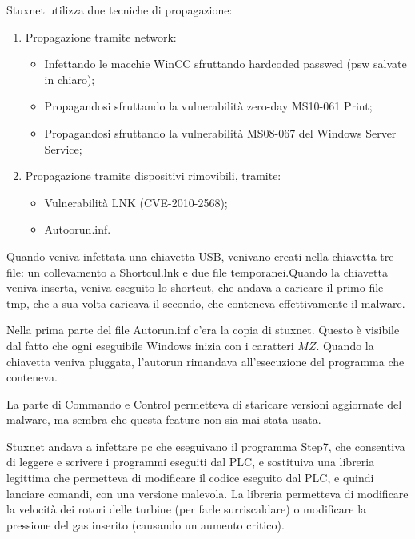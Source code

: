 \noindent Stuxnet utilizza due tecniche di propagazione:
\begin{enumerate}
    \item Propagazione tramite network:
	\begin{itemize}
	    \item Infettando le macchie WinCC sfruttando hardcoded passwed (psw salvate in chiaro);
    	\item Propagandosi sfruttando la vulnerabilità zero-day MS10-061 Print;
    	\item Propagandosi sfruttando la vulnerabilità  MS08-067 del Windows Server Service;
	\end{itemize}
    \item Propagazione tramite dispositivi rimovibili, tramite:
    \begin{itemize}
        \item Vulnerabilità LNK (CVE-2010-2568);
    	\item Autoorun.inf.
    \end{itemize}
\end{enumerate}

\noindent Quando veniva infettata una chiavetta USB, venivano creati nella chiavetta tre file: un collevamento a Shortcul.lnk e due file temporanei.Quando la chiavetta veniva inserta, veniva eseguito lo shortcut, che andava a caricare il primo file tmp, che a sua volta caricava il secondo, che conteneva effettivamente il malware. 
	
Nella prima parte del file Autorun.inf c'era la copia di stuxnet. Questo è visibile dal fatto che ogni eseguibile Windows inizia con i caratteri $MZ$. 
Quando la chiavetta veniva pluggata, l'autorun rimandava all'esecuzione del programma che conteneva.
	
La parte di Commando e Control permetteva di staricare versioni aggiornate del malware, ma sembra che questa feature non sia mai stata usata.
	
Stuxnet andava a infettare pc che eseguivano il programma Step7, che consentiva di leggere e scrivere i programmi eseguiti dal PLC, e sostituiva una  libreria legittima che permetteva di modificare il codice eseguito dal PLC, e quindi lanciare comandi, con una versione malevola.
La libreria permetteva di modificare la velocità dei rotori delle turbine (per farle surriscaldare) o modificare la pressione del gas inserito (causando un aumento critico).

